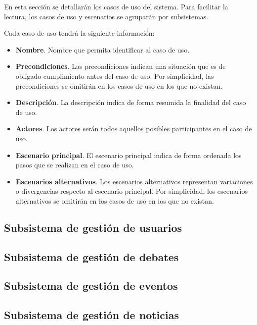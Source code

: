 En esta sección se detallarán los casos de uso del sistema.  Para facilitar la lectura, los casos de uso y escenarios se agruparán por subsistemas.

Cada caso de uso tendrá la siguiente información:
\begin{itemize}
\item \textbf{Nombre}.  Nombre que permita identificar al caso de uso.
\item \textbf{Precondiciones}.  Las precondiciones indican una situación que es de obligado cumplimiento antes del caso de uso.  Por simplicidad, las precondiciones se omitirán en los casos de uso en los que no existan.
\item \textbf{Descripción}.  La descripción indica de forma resumida la finalidad del caso de uso.
\item \textbf{Actores}.  Los actores serán todos aquellos posibles participantes en el caso de uso.
\item \textbf{Escenario principal}.  El escenario principal indica de forma ordenada los pasos que se realizan en el caso de uso.
\item \textbf{Escenarios alternativos}.  Los escenarios alternativos representan variaciones o divergencias respecto al escenario principal.  Por simplicidad, los escenarios alternativos se omitirán en los casos de uso en los que no existan.
\end{itemize}


\subsection{Subsistema de gestión de usuarios}
\label{casos_uso_subsistema_usuarios}


\subsection{Subsistema de gestión de debates}
\label{casos_uso_subsistema_debates}


\subsection{Subsistema de gestión de eventos}
\label{casos_uso_subsistema_eventos}


\subsection{Subsistema de gestión de noticias}
\label{casos_uso_subsistema_noticias}


